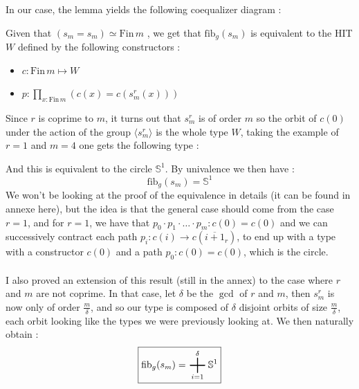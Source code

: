 \documentclass{report}
\DeclareMathOperator*{\bigplus}{\scalerel*{+}{\sum}}
\begin{document}
In our case, the lemma yields the following coequalizer diagram :
\begin{center}
\end{center}
Given that $(s_m = s_m) \simeq \mathrm{Fin} \hspace{2pt} m$ , we get that $\mathrm{fib}_g(s_m)$ is equivalent to the HIT $W$ defined by the following constructors : 
\begin{itemize}
  \item $c : \mathrm{Fin} \hspace{2pt} m \mapsto W$
  \item $ p : \prod_{x : \mathrm{Fin}\hspace{2pt} m} (c(x) = c(s_m^r(x)))$
\end{itemize}
Since $r$ is coprime to $m$, it turns out that $s_m^r$ is of order $m$ so the orbit of $c(0)$ under the action of the group $\langle s_m^r \rangle$ is the whole type $W$, taking the example of $r=1$ and $m=4$ one gets the following type :
\begin{center}
\end{center}
And this is equivalent to the circle $\mathbb{S}^1$. By univalence we then have :
$$\boxed{\mathrm{fib}_g(s_m) = \mathbb{S}^1}$$
We won't be looking at the proof of the equivalence in details (it can be found in annexe here), but the idea is that the general case should come from the case $r=1$, and for $r=1$, we have that $p_0 \cdot p_1 \cdot \ldots \cdot p_m : c(0)=c(0)$ and we can successively contract each path $p_i : c(i)\rightarrow c(\overline{i+1}_r)$, to end up with a type with a constructor $c(0)$ and a path $p_0 : c(0) = c(0)$, which is the circle. \\\\
I also proved an extension of this result (still in the annex) to the case where $r$ and $m$ are not coprime. In that case, let $\delta$ be the $\gcd$ of $r$ and $m$, then $s_m^r$ is now only of order $\frac m{\delta}$, and so our type is composed of $\delta$ disjoint orbits of size $\frac m{\delta}$, each orbit looking like the types we were previously looking at. We then naturally obtain : 
$$\boxed{\mathrm{fib}_g(s_m) = \bigplus_{i=1}^{\delta} \mathbb{S}^1}$$
\end{document}
